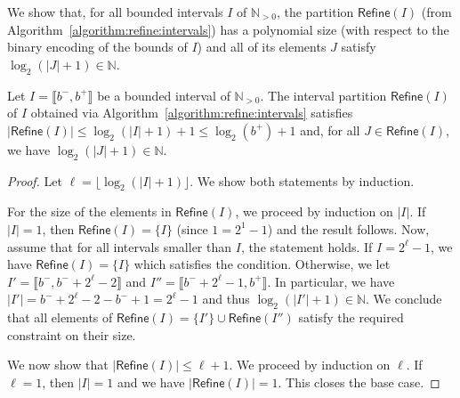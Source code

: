 \documentclass[a4paper,UKenglish,cleveref,autoref,thm-restate,colorlinks]{lipics-v2021}
\newcommand{\integerInterval}[1]{\llbracket{}#1\rrbracket{}}
\newcommand{\IN}{\mathbb{N}}
\newcommand{\INpos}{\IN_{>0}}
\newcommand{\interval}{I}
\newcommand{\intervalB}{J}
\newcommand{\intBound}{b}
\newcommand{\intLB}{\intBound^-}
\newcommand{\intUB}{\intBound^+}
\begin{document}
We show that, for all bounded intervals $\interval$ of $\INpos$, the partition $\mathsf{Refine}(\interval)$ (from Algorithm~\ref{algorithm:refine:intervals}) has a polynomial size (with respect to the binary encoding of the bounds of $\interval$) and all of its elements $\intervalB$ satisfy $\log_2(|\intervalB|+1)\in\IN$.
\begin{lemma}\label{lemma:ocmpd:interval size}
  Let $\interval=\integerInterval{\intLB, \intUB}$ be a bounded interval of $\INpos$.
  The interval partition $\mathsf{Refine}(\interval)$ of $\interval$ obtained via Algorithm~\ref{algorithm:refine:intervals} satisfies $|\mathsf{Refine}(\interval)|\leq\log_2(|\interval|+1)+1\leq\log_2(\intUB)+1$ and, for all $\intervalB\in\mathsf{Refine}(\interval)$, we have $\log_2(|\intervalB|+1)\in\IN$.
\end{lemma}
\begin{proof}
  Let $\ell=\lfloor\log_2(|\interval|+1)\rfloor$.
  We show both statements by induction.

  For the size of the elements in $\mathsf{Refine}(\interval)$, we proceed by induction on $|\interval|$.
  If $|\interval| = 1$, then $\mathsf{Refine}(\interval)=\{\interval\}$ (since $1 = 2^1-1$) and the result follows.
  Now, assume that for all intervals smaller than $\interval$, the statement holds.
  If $\interval = 2^\ell-1$, we have $\mathsf{Refine}(\interval)=\{\interval\}$ which satisfies the condition.
  Otherwise, we let $\interval' = \integerInterval{\intLB, \intLB + 2^\ell -2}$ and $\interval'' = \integerInterval{\intLB + 2^\ell -1, \intUB}$.
  In particular, we have $|\interval'| = \intLB + 2^\ell -2 - \intLB + 1 = 2^\ell-1$ and thus $\log_2(|\interval'|+1)\in\IN$.
  We conclude that all elements of $\mathsf{Refine}(\interval) = \{\interval'\}\cup\mathsf{Refine}(\interval'')$ satisfy the required constraint on their size.

  We now show that $|\mathsf{Refine}(\interval)|\leq\ell+1$.
  We proceed by induction on $\ell$.
  If $\ell=1$, then $|\interval|=1$ and we have $|\mathsf{Refine}(\interval)|=1$.
  This closes the base case.
  

\end{proof}
\end{document}
